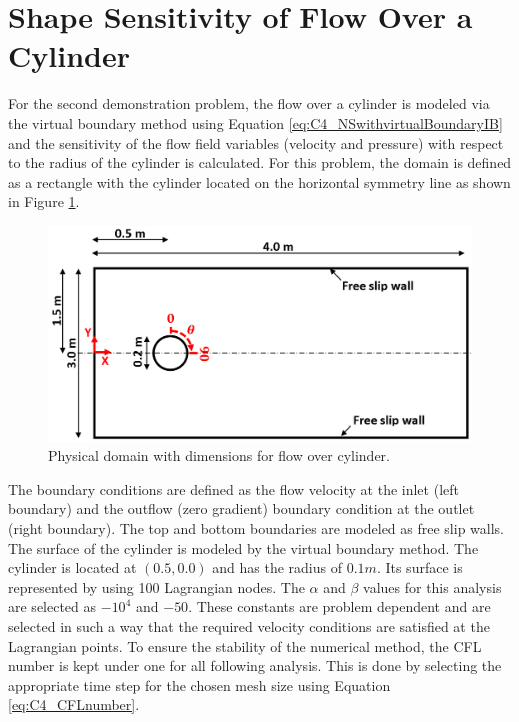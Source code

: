 \section{Shape Sensitivity of Flow Over a Cylinder}
For the second demonstration problem, the flow over a cylinder is modeled via the virtual boundary method using Equation \eqref{eq:C4_NSwithvirtualBoundaryIB} and the sensitivity of the flow field variables (velocity and pressure) with respect to the radius of the cylinder is calculated. For this problem, the domain is defined as a rectangle with the cylinder located on the horizontal symmetry line as shown in Figure \ref{fig:C4_cylinderPhysicalDomain}.

\begin{figure}[H]
    \centering
    \includegraphics[width=12.00cm]{Chapter_4/figure/flow_over_cylinder/flow_over_cylinder.png}
    \caption{Physical domain with dimensions for flow over cylinder.}
    \label{fig:C4_cylinderPhysicalDomain}
\end{figure}

The boundary conditions are defined as the flow velocity at the inlet (left boundary) and the outflow (zero gradient) boundary condition at the outlet (right boundary). The top and bottom boundaries are modeled as free slip walls. The surface of the cylinder is modeled by the virtual boundary method. The cylinder is located at $(0.5, 0.0)$ and has the radius of $0.1 m$. Its surface is represented by using 100 Lagrangian nodes. The $\alpha$ and $\beta$ values for this analysis are selected as $-10^4$ and $-50$. These constants are problem dependent and are selected in such a way that the required velocity conditions are satisfied at the Lagrangian points. To ensure the stability of the numerical method, the CFL number is kept under one for all following analysis. This is done by selecting the appropriate time step for the chosen mesh size using Equation \eqref{eq:C4_CFLnumber}.

